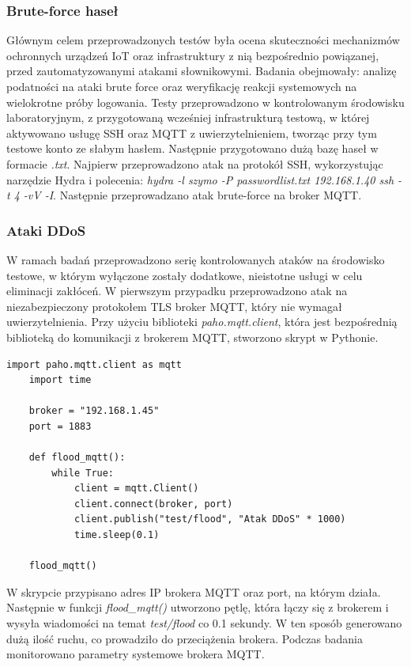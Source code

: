 \subsubsection{Brute-force haseł}
Głównym celem przeprowadzonych testów była ocena skuteczności mechanizmów ochronnych urządzeń IoT oraz infrastruktury z nią bezpośrednio powiązanej, przed zautomatyzowanymi atakami słownikowymi. Badania obejmowały: analizę podatności na ataki brute force oraz weryfikację reakcji systemowych na wielokrotne próby logowania.
Testy przeprowadzono w kontrolowanym środowisku laboratoryjnym, z przygotowaną wcześniej infrastrukturą testową, w której aktywowano usługę SSH oraz MQTT z uwierzytelnieniem, tworząc przy tym testowe konto ze słabym hasłem. Następnie przygotowano dużą bazę haseł w formacie \textit{.txt}.
Najpierw przeprowadzono atak na protokół SSH, wykorzystując narzędzie Hydra i polecenia: \textit{hydra -l szymo -P passwordlist.txt 192.168.1.40 ssh -t 4 -vV -I}. Następnie przeprowadzano atak brute-force na broker MQTT. 

\subsubsection{Ataki DDoS}
W ramach badań przeprowadzono serię kontrolowanych ataków na środowisko testowe, w którym wyłączone zostały dodatkowe, nieistotne usługi w celu eliminacji zakłóceń. 
W pierwszym przypadku przeprowadzono atak na niezabezpieczony protokołem TLS broker MQTT, który nie wymagał uwierzytelnienia. Przy użyciu biblioteki \textit{paho.mqtt.client}, która jest bezpośrednią biblioteką do komunikacji z brokerem MQTT, stworzono skrypt w Pythonie.
\begin{lstlisting}[caption=Skrypt w Pythonie, label=lst:sensor]
    import paho.mqtt.client as mqtt
    import time
    
    broker = "192.168.1.45"
    port = 1883
    
    def flood_mqtt():
        while True:
            client = mqtt.Client()
            client.connect(broker, port)
            client.publish("test/flood", "Atak DDoS" * 1000)
            time.sleep(0.1)
    
    flood_mqtt()
\end{lstlisting}
W skrypcie przypisano adres IP brokera MQTT oraz port, na którym działa. Następnie w funkcji \textit{flood\_mqtt()} utworzono pętlę, która łączy się z brokerem i wysyła wiadomości na temat \textit{test/flood} co 0.1 sekundy. W ten sposób generowano dużą ilość ruchu, co prowadziło do przeciążenia brokera.
Podczas badania monitorowano parametry systemowe brokera MQTT.

